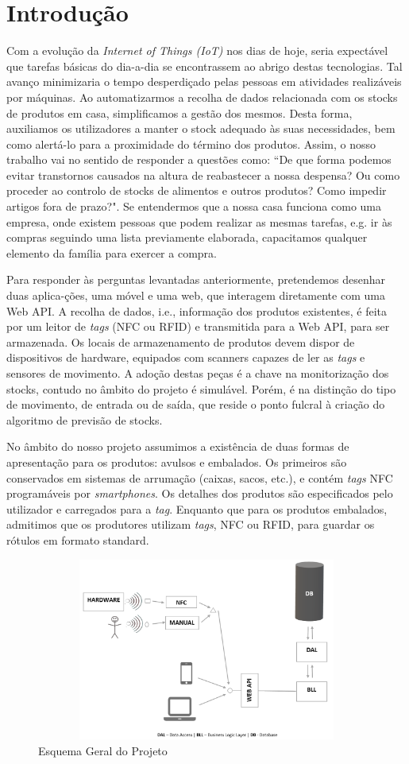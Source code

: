 %
%
\section*{Introdução} \label{Introducao}

Com a evolução da \textit{Internet of Things (IoT)} nos dias de hoje, seria expectável que tarefas básicas do dia-a-dia se encontrassem ao abrigo destas tecnologias. Tal avanço minimizaria o tempo desperdiçado pelas pessoas em atividades realizáveis por máquinas. Ao automatizarmos a recolha de dados relacionada com os stocks de produtos em casa, simplificamos a gestão dos mesmos. Desta forma, auxiliamos os utilizadores a manter o stock adequado às suas necessidades, bem como alertá-lo para a proximidade do término dos produtos. Assim, o nosso trabalho vai no sentido de responder a questões como: ``De que forma podemos evitar transtornos causados na altura de reabastecer a nossa despensa? Ou como proceder ao controlo de stocks de alimentos e outros produtos? Como impedir artigos fora de prazo?". Se entendermos que a nossa casa funciona como uma empresa, onde existem pessoas que podem realizar as mesmas tarefas, e.g. ir às compras seguindo uma lista previamente elaborada, capacitamos qualquer elemento da família para exercer a compra.

Para responder às perguntas levantadas anteriormente, pretendemos desenhar duas aplica-ções, uma móvel e uma web, que interagem diretamente com uma Web API. A recolha de dados, i.e., informação dos produtos existentes, é feita por um leitor de \textit{tags} (NFC ou RFID) e transmitida para a Web API, para ser armazenada. Os locais de armazenamento de produtos devem dispor de dispositivos de hardware, equipados com scanners capazes de ler as \textit{tags} e sensores de movimento. A adoção destas peças é a chave na monitorização dos stocks, contudo no âmbito do projeto é simulável. Porém, é na distinção do tipo de movimento, de entrada ou de saída, que reside o ponto fulcral à criação do algoritmo de previsão de stocks.

No âmbito do nosso projeto assumimos a existência de duas formas de apresentação para os produtos: avulsos e embalados. Os primeiros são conservados em sistemas de arrumação (caixas, sacos, etc.), e contém \textit{tags} NFC programáveis por \textit{smartphones}. Os detalhes dos produtos são especificados pelo utilizador e carregados para a \textit{tag}. Enquanto que para os produtos embalados, admitimos que os produtores utilizam \textit{tags}, NFC ou RFID, para guardar os rótulos em formato standard.

\vspace{-15mm}
\hspace{5mm}

\begin{figure}[h!]
	\includegraphics[width=14cm,height=6cm,scale=0.5]{./figures/Esquema_Estrutura_Projeto_Geral.png}
	\caption{Esquema Geral do Projeto}
	\label{esquema_geral}
\end{figure}